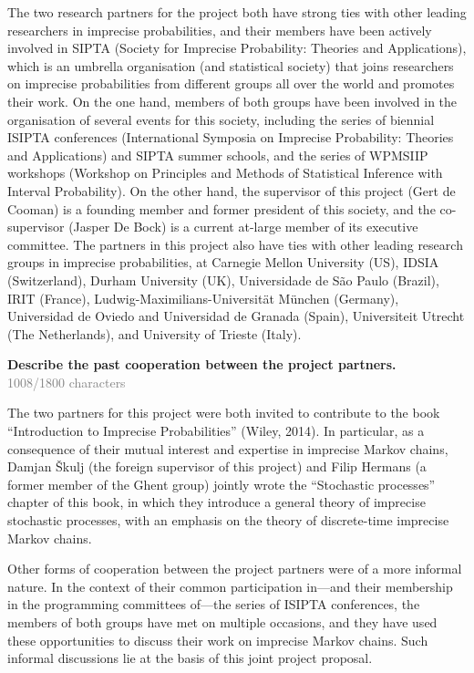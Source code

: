 \documentclass[11pt,dvipsnames,usenames,a4paper]{article}
\begin{document}
The two research partners for the project both have strong ties with other leading researchers in imprecise probabilities, and their members have been actively involved in SIPTA (Society for Imprecise Probability: Theories and Applications), which is an umbrella organisation (and statistical society) that joins researchers on imprecise probabilities from different groups all over the world and promotes their work. 
On the one hand, members of both groups have been involved in the organisation of several events for this society, including the series of biennial ISIPTA conferences (International Symposia on Imprecise Probability: Theories and Applications) and SIPTA summer schools, and the series of WPMSIIP workshops (Workshop on Principles and Methods of Statistical Inference with Interval Probability). 
On the other hand, the supervisor of this project (Gert de Cooman) is a founding member and former president of this society, and the co-supervisor (Jasper De Bock) is a current at-large member of its executive committee. 
The partners in this project also have ties with other leading research groups in imprecise probabilities, at Carnegie Mellon University (US), IDSIA (Switzerland), Durham University (UK), Universidade de S\~ao Paulo (Brazil), IRIT (France), Ludwig-Maximilians-Universit\"at M\"unchen (Germany), Universidad de Oviedo and Universidad de Granada (Spain), Universiteit Utrecht (The Netherlands), and University of Trieste (Italy). 

\textbf{Describe the past cooperation between the project partners.}\\
\textcolor{Gray}{1008/1800 characters}

The two partners for this project were both invited to contribute to the book ``Introduction to Imprecise Probabilities'' (Wiley, 2014). 
In particular, as a consequence of their mutual interest and expertise in imprecise Markov chains, Damjan \v{S}kulj (the foreign supervisor of this project) and Filip Hermans (a former member of the Ghent group) jointly wrote the ``Stochastic processes'' chapter of this book, in which they introduce a general theory of imprecise stochastic processes, with an emphasis on the theory of discrete-time imprecise Markov chains.

Other forms of cooperation between the project partners were of a more informal nature. 
In the context of their common participation in---and their membership in the programming committees of---the series of ISIPTA conferences, the members of both groups have met on multiple occasions, and they have used these opportunities to discuss their work on imprecise Markov chains. 
Such informal discussions lie at the basis of this joint project proposal.
\end{document}
